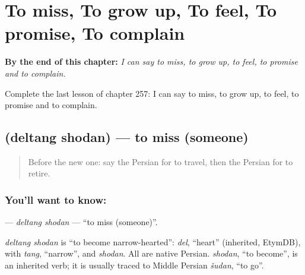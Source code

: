 
\chapter{To miss, To grow up, To feel, To promise, To complain}
\label{ch:fa-to-miss-to-grow-up-to-feel-to-promise-to-complain}

\begin{chapteropening}
\textbf{By the end of this chapter:} \emph{I can say to miss, to grow up, to feel, to promise and to complain.}

Complete the last lesson of chapter 257: I can say to miss, to grow up, to feel, to promise and to complain.
\end{chapteropening}

\section[\texorpdfstring{\fa{دلتنگ} \fa{شدن} (deltang shodan)}{دلتنگ شدن (deltang shodan)}]{  (deltang shodan) — to miss (someone)}

\label{lesson:FA-C257-deltang-shodan}



\begin{quote}
Before the new one: say the Persian for to travel, then the Persian for to retire.
\end{quote}

\subsection*{You'll want to know:  }
\textbf{ } — \emph{deltang shodan} — \textquotedblleft{}to miss (someone)\textquotedblright{}.

\begin{cousinweb}
\emph{deltang shodan} is \textquotedblleft{}to become narrow-hearted\textquotedblright{}: \emph{del}, \textquotedblleft{}heart\textquotedblright{} (inherited, EtymDB), with \emph{tang}, \textquotedblleft{}narrow\textquotedblright{}, and \emph{shodan}. All are native Persian. \emph{shodan}, \textquotedblleft{}to become\textquotedblright{}, is an inherited verb; it is usually traced to Middle Persian \emph{šudan}, \textquotedblleft{}to go\textquotedblright{}.
\end{cousinweb}

